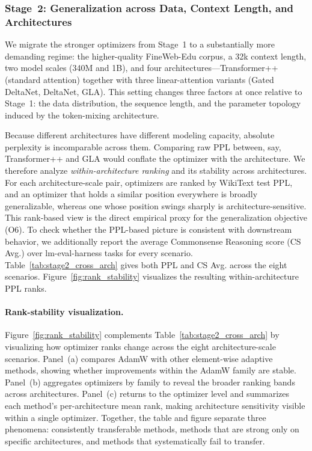 \subsubsection{Stage~2: Generalization across Data, Context Length, and Architectures}
\label{sec:benchmark-stage2}

We migrate the stronger optimizers from Stage~1 to a substantially more
demanding regime: the higher-quality FineWeb-Edu corpus, a 32k context length,
two model scales (340M and 1B), and four architectures---Transformer++
(standard attention) together with three linear-attention variants (Gated
DeltaNet, DeltaNet, GLA). This setting changes three factors at once relative
to Stage~1: the data distribution, the sequence length, and the parameter
topology induced by the token-mixing architecture.

Because different architectures have different modeling capacity, absolute
perplexity is incomparable across them. Comparing raw PPL between, say,
Transformer++ and GLA would conflate the optimizer with the architecture. We
therefore analyze \emph{within-architecture ranking} and its stability across
architectures. For each architecture-scale pair, optimizers are ranked by
WikiText test PPL, and an optimizer that holds a similar position everywhere is
broadly generalizable, whereas one whose position swings sharply is
architecture-sensitive. This rank-based view is the direct empirical proxy for
the generalization objective (O6). To check whether the PPL-based picture is
consistent with downstream behavior, we additionally report the average
Commonsense Reasoning score (CS Avg.) over lm-eval-harness tasks for every
scenario. Table~\ref{tab:stage2_cross_arch} gives both PPL and CS Avg. across
the eight scenarios. Figure~\ref{fig:rank_stability} visualizes the resulting
within-architecture PPL ranks.



\paragraph{Rank-stability visualization.}
Figure~\ref{fig:rank_stability} complements Table~\ref{tab:stage2_cross_arch}
by visualizing how optimizer ranks change across the eight architecture-scale
scenarios. Panel~(a) compares AdamW with other element-wise adaptive methods,
showing whether improvements within the AdamW family are stable. Panel~(b)
aggregates optimizers by family to reveal the broader ranking bands across
architectures. Panel~(c) returns to the optimizer level and summarizes each
method's per-architecture mean rank, making architecture sensitivity visible
within a single optimizer. Together, the table and figure separate three
phenomena: consistently transferable methods, methods that are strong only on
specific architectures, and methods that systematically fail to transfer.

